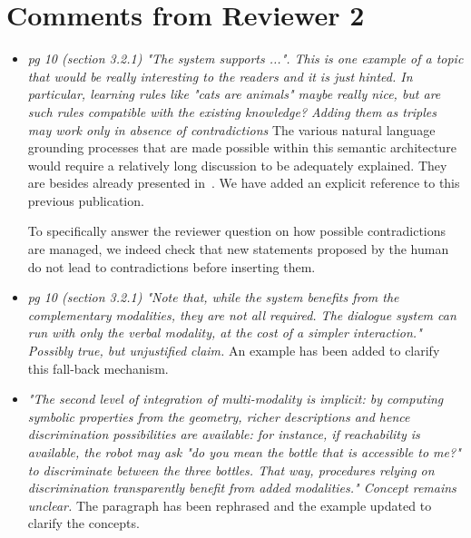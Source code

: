 \documentclass{article}
\begin{document}
\section{Comments from Reviewer 2}

\begin{itemize}
    \item \emph{pg 10 (section 3.2.1)
            "The system supports ...". This is one example of a topic that would
            be really interesting to the readers and it is just hinted. In
            particular, learning rules like "cats are animals" maybe really
            nice, but are such rules compatible with the existing knowledge?
            Adding them as triples may work only in absence of contradictions} The
            various natural language grounding processes that are made possible
            within this semantic
            architecture would require a relatively long discussion to be adequately
            explained. They are besides already presented in~\cite{Lemaignan2011a}.
            We have added an explicit reference to this previous publication.

            To specifically answer the reviewer question on how possible
            contradictions are managed, we indeed check that new statements proposed
            by the human do not lead to contradictions before inserting them.

    \item \emph{pg 10 (section 3.2.1)
            "Note that, while the system benefits from the complementary
            modalities, they are not all
            required. The dialogue system can run with only the verbal modality,
            at the cost of a simpler interaction."
        Possibly true, but unjustified claim.} An example has been added to
        clarify this fall-back mechanism.

    \item \emph{"The second level of integration of multi-modality is implicit:
            by computing symbolic properties 
            from the geometry, richer descriptions and hence discrimination
            possibilities are available: 
            for instance, if reachability is available, the robot may ask "do
            you mean the bottle that is 
            accessible to me?" to discriminate between the three bottles. That
            way, procedures relying on 
            discrimination transparently benefit from added modalities." Concept
            remains unclear.} The paragraph has been rephrased and the example
            updated to clarify the concepts.


\end{itemize}
\end{document}
